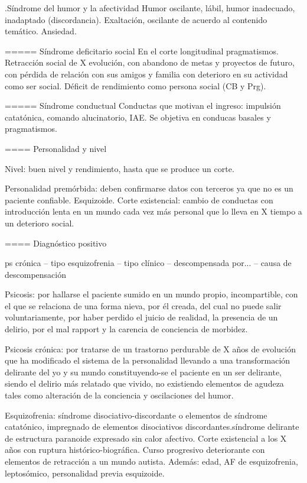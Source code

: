 \documentclass[encares.tex]{subfiles}
\begin{document}
.Síndrome del humor y la afectividad
Humor oscilante, lábil, humor inadecuado, inadaptado (discordancia). Exaltación, oscilante de acuerdo al contenido temático. Ansiedad.

===== Síndrome deficitario social
En el corte longitudinal pragmatismos. Retracción social de X evolución, con abandono de metas y proyectos de futuro, con pérdida de relación con sus amigos y familia con deterioro en su actividad como ser social. Déficit de rendimiento como persona social (CB y Prg).

===== Síndrome conductual
Conductas que motivan el ingreso: impulsión catatónica, comando alucinatorio, IAE. Se objetiva en conducas basales y pragmatismos.

==== Personalidad y nivel

Nivel: buen nivel y rendimiento, hasta que se produce un corte.

Personalidad premórbida: deben confirmarse datos con terceros ya que no es un paciente confiable. Esquizoide. Corte existencial: cambio de conductas con introducción lenta en un mundo cada vez más personal que lo lleva en X tiempo a un deterioro social.

==== Diagnóstico positivo

ps crónica – tipo esquizofrenia – tipo clínico – descompensada por... – causa de descompensación

Psicosis: por hallarse el paciente sumido en un mundo propio, incompartible, con el que se relaciona de una forma nieva, por él creada, del cual no puede salir voluntariamente, por haber perdido el juicio de realidad, la presencia de un delirio, por el mal rapport y la carencia de conciencia de morbidez.

Psicosis crónica: por tratarse de un trastorno perdurable de X años de evolución que ha modificado el sistema de la personalidad llevando a una transformación delirante del yo y su mundo constituyendo-se el paciente en un ser delirante, siendo el delirio más relatado que vivido, no existiendo elementos de agudeza tales como alteración de la conciencia y oscilaciones del humor.

Esquizofrenia: síndrome disociativo-discordante o elementos de síndrome catatónico, impregnado de elementos disociativos discordantes.síndrome delirante de estructura paranoide expresado sin calor afectivo. Corte existencial a los X años con ruptura histórico-biográfica. Curso progresivo deteriorante con elementos de retracción a un mundo autista. Además: edad, AF de esquizofrenia, leptosómico, personalidad previa esquizoide.
\end{document}
